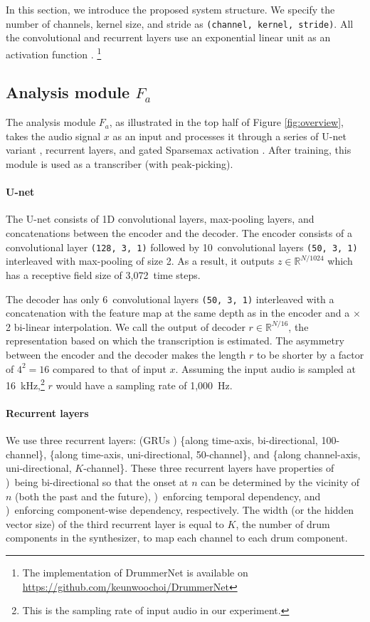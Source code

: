 \documentclass{article}
\newcommand{\largesqueeze}{\vspace{-0.2cm}}
\begin{document}
	In this section, we introduce the proposed system structure. We specify the number of channels, kernel size, and stride as \texttt{(channel, kernel, stride)}. All the convolutional and recurrent layers use an exponential linear unit as an activation function \cite{clevert2015fast}. \footnote{The implementation of DrummerNet is available on \url{https://github.com/keunwoochoi/DrummerNet}}
	
	\subsection{Analysis module $F_a$}
	The analysis module $F_a$, as illustrated in the top half of Figure \ref{fig:overview}, takes the audio signal $x$ as an input and processes it through a series of U-net variant \cite{ronneberger2015u}, recurrent layers, and gated Sparsemax activation \cite{martins2016softmax}. After training, this module is used as a transcriber (with peak-picking).
	
	\largesqueeze
	\paragraph{U-net}
	The U-net consists of 1D convolutional layers, max-pooling layers, and concatenations between the encoder and the decoder. The encoder consists of a convolutional layer \texttt{(128, 3, 1)} followed by 10~convolutional layers \texttt{(50, 3, 1)} interleaved with max-pooling of size 2. As a result, it outputs $z \in \mathbb{R}^{N/1024}$ which has a receptive field size of 3,072~time steps.
	
	The decoder has only 6~convolutional layers \texttt{(50, 3, 1)} interleaved with a concatenation with the feature map at the same depth as in the encoder and a  $\times$2 bi-linear interpolation. We call the output of decoder $r \in \mathbb{R}^{N/16}$, the representation based on which the transcription is estimated.
	The asymmetry between the encoder and the decoder makes the length $r$ to be shorter by a factor of $4^2=16$ compared to that of input $x$. Assuming the input audio is sampled at 16~kHz,\footnote{
		This is the sampling rate of input audio in our experiment.
	} $r$ would have a sampling rate of 1,000~Hz. 
	\largesqueeze
	\paragraph{Recurrent layers}
	
	We use three recurrent layers: ($\text{GRUs}$ \cite{chung2014empirical}) \{along time-axis, bi-directional, 100-channel\}, \{along time-axis, uni-directional, 50-channel\}, and \{along channel-axis, uni-directional, 
	$K$-channel\}. These three recurrent layers have properties of  )~being bi-directional so that the onset at $n$ can be determined by the vicinity of $n$ (both the past and the future), )~enforcing temporal dependency, and )~enforcing component-wise dependency, respectively. The width (or the hidden vector size) of the third recurrent layer is equal to $K$, the number of drum components in the synthesizer, to map each channel to each drum component.
	\largesqueeze
\end{document}
